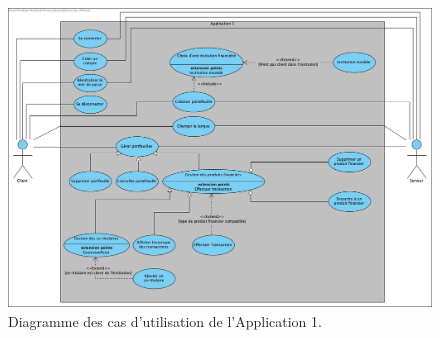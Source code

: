 \documentclass[../rapport.tex]{subfiles}
\begin{document}
		\begin{figure}[h]
				\centering \includegraphics[scale=0.3]{ressources/photos_diagrammes/app1/use_case_app1.jpg}
				\caption{Diagramme des cas d'utilisation de l'Application 1.}
		\end{figure}
\end{document}
